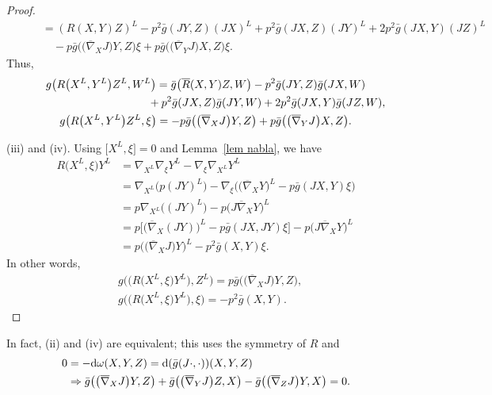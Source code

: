 \documentclass[10pt,a4paper]{amsart}
\numberwithin{equation}{section}
\theoremstyle{definition}
\newcommand{\bn}{\nabla}
\newcommand{\bbn}{\overline{\nabla}}
\newcommand{\bxi}{\xi}
\newcommand{\br}{ R}
\newcommand{\brr}{\overline R}
\newcommand{\bgg}{\bar g}
\newcommand{\bg}{ g}
\newcommand{\xl}{X^L}
\newcommand{\yl}{Y^L}
\newcommand{\zl}{Z^L}
\begin{document}
\begin{proof}
\begin{align*}
 &\qquad{}= (R(X, Y)Z)^L - p^2 \bgg(J Y, Z)(J X)^{L} + p^2 \bgg(J X, Z)(J Y)^{L} + 2 p^2 \bgg(JX, Y)(J Z)^{L} \nonumber\\
 &\qquad\quad{} - p \bgg\bigl(\bigl(\bbn_{X} J\bigr)Y, Z\bigr) \xi + p \bgg\bigl(\bigl(\bbn_{Y} J\bigr)X, Z\bigr) \xi. \nonumber
\end{align*}
Thus,
\begin{gather*}
g\bigl(R\bigl(X^{L}, Y^{L}\bigr)Z^{L}, W^{L}\bigr)
 = \bgg\bigl( \brr(X, Y) Z, W\bigr) - p^{2} \bgg(J Y, Z) \bgg(J X, W)\\
 \hphantom{g\bigl(R\bigl(X^{L}, Y^{L}\bigr)Z^{L}, W^{L}\bigr)=}{}
 + p^{2} \bgg(J X, Z) \bgg(J Y, W) + 2 p^{2} \bgg(J X, Y) \bgg(J Z, W),\\
\bg\bigl( R\bigl(X^{L}, Y^{L}\bigr)Z^{L}, \xi \bigr)
 = - p \bgg\bigl(\bigl(\bbn_{X} J\bigr) Y, Z\bigr) + p \bgg\bigl(\bigl(\bbn_{Y} J\bigr) X, Z\bigr).
\end{gather*}

(iii) and (iv). Using $\bigl[\xl,\bxi\bigr] = 0$ and Lemma~\ref{lem nabla}, we have
\begin{align*}
 \br\big(\xl,\bxi\big)\yl &= \bn_{\xl}\bn_{\bxi}\yl - \bn_{\bxi}\bn_{\xl}\yl\\
 & = \bn_{\xl}\bigl(p(JY)^L\bigr) - \bn_{\bxi}\bigl(\bigl(\overline{\nabla}_XY\bigr)^L - p\bgg(JX,Y)\bxi\bigr)\\
 &= p \bn_{\xl}\bigl((JY)^L\bigr)-p \bigl(J\bbn_XY\bigr)^L\\
 &= p\bigl[\bigl(\bbn_X(JY)\bigr)^L -p\bgg(JX,JY)\bxi\bigr]-p \bigl(J\bbn_XY\bigr)^L\\
 &= p\bigl(\bigl(\bbn_XJ\bigr)Y\bigr)^L - p^2 \bgg(X,Y)\bxi.
 \end{align*}
In other words,
\begin{align*}
 &\bg\bigl(\bigl( \br\bigl(\xl,\bxi\bigr)\yl),\zl\bigr)= p\bgg\bigl(\bigl(\bbn_XJ\bigr)Y, Z\bigr),\\
& \bg\bigl(\bigl( \br\bigl(\xl,\bxi\bigr)\yl\bigr),\bxi\bigr)= -p^2\bgg(X,Y).
\tag*{\qed}
\end{align*}\renewcommand{\qed}{}
 \end{proof}

 In fact, (ii) and (iv) are equivalent; this uses the symmetry of $\br$ and
 \begin{align*} 0 &= -{\rm d}\omega(X,Y,Z) = {\rm d}(\bgg(J\cdot,\cdot))(X,Y,Z)\\
 & \Rightarrow
 \bgg\bigl(\bigl(\bbn_X J\bigr) Y,Z\bigr) + \bgg\bigl(\bigl(\bbn_Y J\bigr)Z,X\bigr) - \bgg\bigl(\bigl(\bbn_Z J\bigr)Y,X\bigr) = 0.
 \end{align*}
\end{document}
